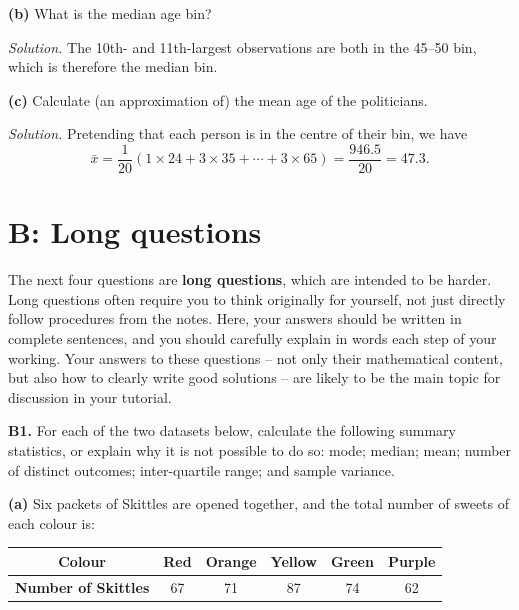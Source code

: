\documentclass[
  a4paper,
]{book}
\theoremstyle{definition}
\theoremstyle{definition}
\theoremstyle{definition}
\theoremstyle{definition}
\theoremstyle{remark}
\begin{document}
\textbf{(b)} What is the median age bin?

\begin{myanswers}
\emph{Solution.} The 10th- and 11th-largest observations are both in the 45--50 bin, which is therefore the median bin.

\end{myanswers}

\textbf{(c)} Calculate (an approximation of) the mean age of the politicians.

\begin{myanswers}
\emph{Solution.}
Pretending that each person is in the centre of their bin, we have
\[ \bar x = \frac{1}{20} (1\times24 + 3\times 35 + \cdots + 3 \times 65) = \frac{946.5}{20} = 47.3 . \]

\end{myanswers}

\hypertarget{P1-long}{%
\section*{B: Long questions}\label{P1-long}}

The next four questions are \textbf{long questions}, which are intended to be harder. Long questions often require you to think originally for yourself, not just directly follow procedures from the notes. Here, your answers should be written in complete sentences, and you should carefully explain in words each step of your working. Your answers to these questions -- not only their mathematical content, but also how to clearly write good solutions -- are likely to be the main topic for discussion in your tutorial.

\textbf{B1.} For each of the two datasets below, calculate the following summary statistics, or explain why it is not possible to do so: mode; median; mean; number of distinct outcomes; inter-quartile range; and sample variance.

\textbf{(a)} Six packets of Skittles are opened together, and the total number of sweets of each colour is:

\begin{longtable}[]{@{}cccccc@{}}
\toprule
\textbf{Colour} & Red & Orange & Yellow & Green & Purple \\
\midrule
\endhead
\textbf{Number of Skittles} & 67 & 71 & 87 & 74 & 62 \\
\bottomrule
\end{longtable}
\end{document}

